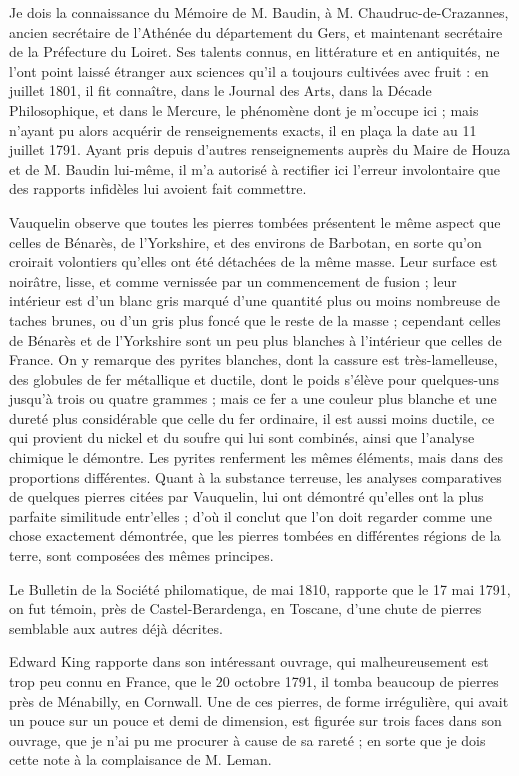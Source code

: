 \documentclass[a4paper, 12pt, oneside, french]{article}
\begin{document}
Je dois la connaissance du Mémoire de M. Baudin, à M. Chaudruc-de-Crazannes, ancien secrétaire de l'Athénée du département du Gers, et maintenant secrétaire de la Préfecture du Loiret. Ses talents connus, en littérature et en antiquités, ne l'ont point laissé étranger aux sciences qu'il a toujours cultivées avec fruit : en juillet 1801, il fit connaître, dans le Journal des Arts, dans la Décade Philosophique, et dans le Mercure, le phénomène dont je m'occupe ici ; mais n'ayant pu alors acquérir de renseignements exacts, il en plaça la date au 11 juillet 1791. Ayant pris depuis d'autres renseignements auprès du Maire de Houza et de M. Baudin lui-même, il m'a autorisé à rectifier ici l'erreur involontaire que des rapports infidèles lui avoient fait commettre.

Vauquelin observe que toutes les pierres tombées présentent le même aspect que celles de Bénarès, de l'Yorkshire, et des environs de Barbotan, en sorte qu'on croirait volontiers qu'elles ont été détachées de la même masse. Leur surface est noirâtre, lisse, et comme vernissée par un commencement de fusion ; leur intérieur est d'un blanc gris marqué d'une quantité plus ou moins nombreuse de taches brunes, ou d'un gris plus foncé que le reste de la masse ; cependant celles de Bénarès et de l'Yorkshire sont un peu plus blanches à l'intérieur que celles de France. On y remarque des pyrites blanches, dont la cassure est très-lamelleuse, des globules de fer métallique et ductile, dont le poids s'élève pour quelques-uns jusqu'à trois ou quatre grammes ; mais ce fer a une couleur plus blanche et une dureté plus considérable que celle du fer ordinaire, il est aussi moins ductile, ce qui provient du nickel et du soufre qui lui sont combinés, ainsi que l'analyse chimique le démontre. Les pyrites renferment les mêmes éléments, mais dans des proportions différentes. Quant à la substance terreuse, les analyses comparatives de quelques pierres citées par Vauquelin, lui ont démontré qu'elles ont la plus parfaite similitude entr'elles ; d'où il conclut que l'on doit regarder comme une chose exactement démontrée, que les pierres tombées en différentes régions de la terre, sont composées des mêmes principes.

Le Bulletin de la Société philomatique, de mai 1810, rapporte que le 17 mai 1791, on fut témoin, près de Castel-Berardenga, en Toscane, d'une chute de pierres semblable aux autres déjà décrites.

Edward King rapporte dans son intéressant ouvrage, qui malheureusement est trop peu connu en France, que le 20 octobre 1791, il tomba beaucoup de pierres près de Ménabilly, en Cornwall. Une de ces pierres, de forme irrégulière, qui avait un pouce sur un pouce et demi de dimension, est figurée sur trois faces dans son ouvrage, que je n'ai pu me procurer à cause de sa rareté ; en sorte que je dois cette note à la complaisance de M. Leman.
\end{document}

